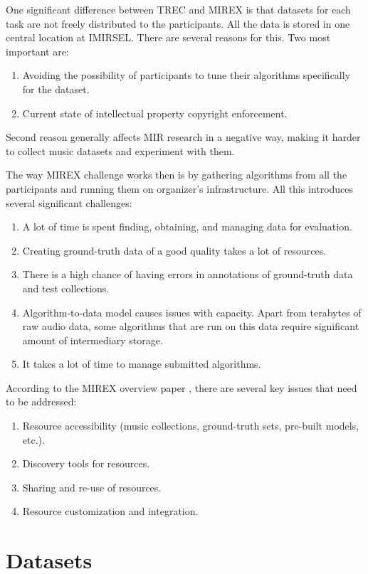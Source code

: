 One significant difference between TREC and MIREX is that datasets for each task are not freely distributed to the participants. All the data is stored in one central location at IMIRSEL. There are several reasons for this. Two most important are:
\begin{enumerate}
    \item Avoiding the possibility of participants to tune their algorithms specifically for the dataset.
    \item Current state of intellectual property copyright enforcement.
\end{enumerate}
Second reason generally affects MIR research in a negative way, making it harder to collect music datasets and experiment with them.

The way MIREX challenge works then is by gathering algorithms from all the participants and running them on organizer's infrastructure. All this introduces several significant challenges:
\begin{enumerate}
    \item A lot of time is spent finding, obtaining, and managing data for evaluation.
    \item Creating ground-truth data of a good quality takes a lot of resources.
    \item There is a high chance of having errors in annotations of ground-truth data and test collections.
    \item Algorithm-to-data model causes issues with capacity. Apart from terabytes of raw audio data, some algorithms that are run on this data require significant amount of intermediary storage.
    \item It takes a lot of time to manage submitted algorithms.
\end{enumerate}

According to the MIREX overview paper \cite{downie2008mirex}, there are several key issues that need to be addressed:
\begin{enumerate}
    \item Resource accessibility (music collections, ground-truth sets, pre-built models, etc.).
    \item Discovery tools for resources.
    \item Sharing and re-use of resources.
    \item Resource customization and integration.
\end{enumerate}

\section{Datasets}
\label{sec:soa:datasets}

